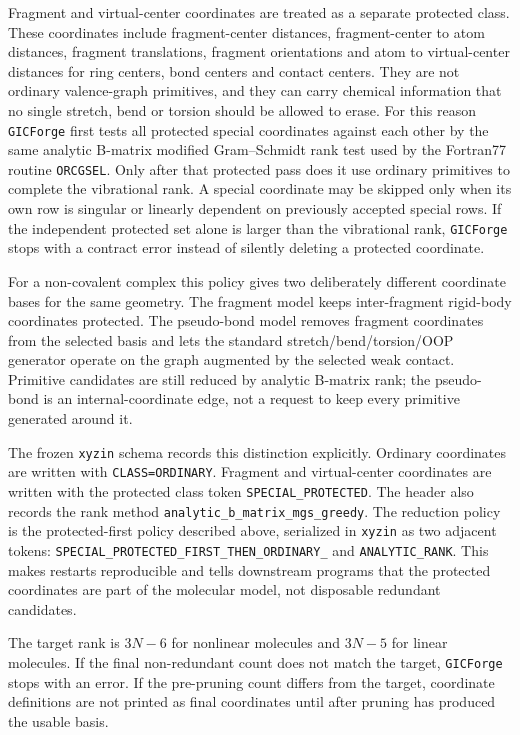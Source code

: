 \documentclass[11pt]{article}
\newcommand{\program}{\texttt{GICForge}}
\newcommand{\xyzin}{\texttt{xyzin}}
\begin{document}
Fragment and virtual-center coordinates are treated as a separate protected
class.  These coordinates include fragment-center distances, fragment-center to
atom distances, fragment translations, fragment orientations and atom to
virtual-center distances for ring centers, bond centers and contact centers.
They are not ordinary valence-graph primitives, and they can carry chemical
information that no single stretch, bend or torsion should be allowed to erase.
For this reason \program{} first tests all protected special coordinates
against each other by the same analytic B-matrix modified Gram--Schmidt rank
test used by the Fortran77 routine \texttt{ORCGSEL}.  Only after that protected
pass does it use ordinary primitives to complete the vibrational rank.  A
special coordinate may be skipped only when its own row is singular or linearly
dependent on previously accepted special rows.  If the independent protected
set alone is larger than the vibrational rank, \program{} stops with a contract
error instead of silently deleting a protected coordinate.

For a non-covalent complex this policy gives two deliberately different
coordinate bases for the same geometry.  The fragment model keeps
inter-fragment rigid-body coordinates protected.  The pseudo-bond model removes
fragment coordinates from the selected basis and lets the standard
stretch/bend/torsion/OOP generator operate on the graph augmented by the
selected weak contact.  Primitive candidates are still reduced by analytic
B-matrix rank; the pseudo-bond is an internal-coordinate edge, not a request to
keep every primitive generated around it.

The frozen \xyzin{} schema records this distinction explicitly.  Ordinary
coordinates are written with \texttt{CLASS=ORDINARY}.  Fragment and
virtual-center coordinates are written with the protected class token
\texttt{SPECIAL\_PROTECTED}.  The header also records the rank method
\texttt{analytic\_b\_matrix\_mgs\_greedy}.  The reduction policy is the
protected-first policy described above, serialized in \xyzin{} as
two adjacent tokens:
\texttt{SPECIAL\_PROTECTED\_FIRST\_THEN\_ORDINARY\_} and
\texttt{ANALYTIC\_RANK}.
This makes restarts reproducible and tells downstream programs that the
protected coordinates are part of the molecular model, not disposable
redundant candidates.

The target rank is \(3N-6\) for nonlinear molecules and \(3N-5\) for linear
molecules.  If the final non-redundant count does not match the target,
\program{} stops with an error.  If the pre-pruning count differs from the
target, coordinate definitions are not printed as final coordinates until after
pruning has produced the usable basis.
\end{document}
